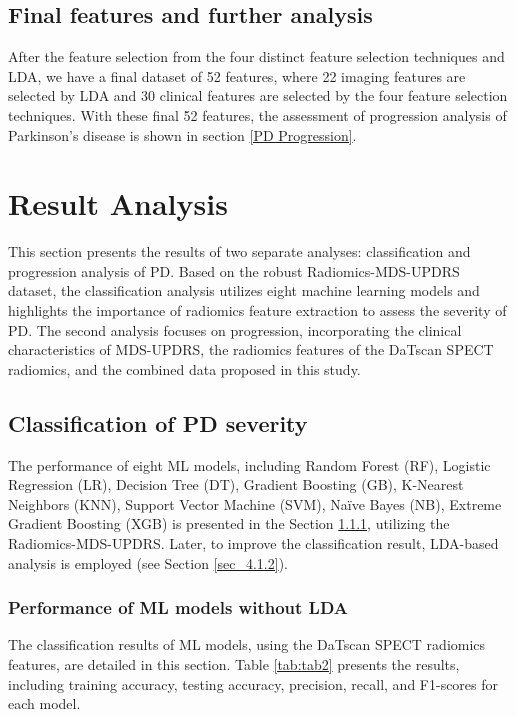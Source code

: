 \documentclass{article}
\begin{document}
\subsection{Final features and further analysis}
After the feature selection from the four distinct feature selection techniques and LDA, we have a final dataset of 52 features, where 22 imaging features are selected by LDA and 30 clinical features are selected by the four feature selection techniques. With these final 52 features, the assessment of progression analysis of Parkinson's disease is shown in section \ref{PD Progression}.

\section{Result Analysis}
\label{Result}

This section presents the results of two separate analyses: classification and progression analysis of PD. Based on the robust Radiomics-MDS-UPDRS dataset, the classification analysis utilizes eight machine learning models and highlights the importance of radiomics feature extraction to assess the severity of PD. The second analysis focuses on progression, incorporating the clinical characteristics of MDS-UPDRS, the radiomics features of the DaTscan SPECT radiomics, and the combined data proposed in this study. 


\subsection{Classification of PD severity }
The performance of eight ML models, including Random Forest (RF), Logistic Regression (LR), Decision Tree (DT), Gradient Boosting (GB), K-Nearest Neighbors (KNN), Support Vector Machine (SVM), Naïve Bayes (NB), Extreme Gradient Boosting (XGB) is presented in the Section \ref{sec_4.1.1}, utilizing the Radiomics-MDS-UPDRS. Later, to improve the classification result, LDA-based analysis is employed (see Section \ref{sec_4.1.2}).

\subsubsection{Performance of ML models without LDA}
\label{sec_4.1.1}
The classification results of ML models, using the DaTscan SPECT radiomics features, are detailed in this section. Table \ref{tab:tab2} presents the results, including training accuracy, testing accuracy, precision, recall, and F1-scores for each model. 
\end{document}
